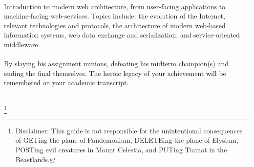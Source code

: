 \documentclass[letterpaper,10pt,twoside,twocolumn,openany]{book}
\begin{document}
\frontmatter                           
\begin{titlepage}
  ~
  \newpage
  
  \begin{center}


    \large
    \vspace*{\fill}
    Introduction to modern web architecture, from user-facing applications to machine-facing web-services. Topics include: the evolution of the Internet, relevant technologies and protocols, the architecture of modern web-based information systems, web data exchange and serialization, and service-oriented middleware. 
    \\~\\
    By slaying his assignment minions, defeating his midterm champion(s) and ending the final themselves. The heroic legacy of your achievement will be remembered on your academic transcript.
    \\~\\
    \vspace*{\fill}

  \end{center}
  \let\thefootnote\relax\footnote{Disclaimer: This guide is not responsible for the unintentional consequences of GETing the plane of Pandemonium, DELETEing the plane of Elysium, POSTing evil creatures in Mount Celestia, and PUTing Tiamat in the Beastlands.}
\end{titlepage}
\tableofcontents
\mainmatter
  
  
  
  
  
  
  
  
  
  
\end{document}
